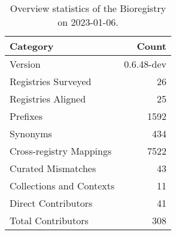 \begin{table}
\centering
\caption{Overview statistics of the Bioregistry on 2023-01-06.}
\label{tab:bioregistry-summary}
\begin{tabular}{lr}
\toprule
                Category &      Count \\
\midrule
                 Version & 0.6.48-dev \\
     Registries Surveyed &         26 \\
      Registries Aligned &         25 \\
                Prefixes &       1592 \\
                Synonyms &        434 \\
 Cross-registry Mappings &       7522 \\
      Curated Mismatches &         43 \\
Collections and Contexts &         11 \\
     Direct Contributors &         41 \\
      Total Contributors &        308 \\
\bottomrule
\end{tabular}
\end{table}

